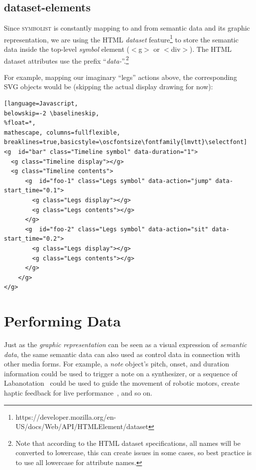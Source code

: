 \documentclass{article}
\def\symbolist{\textsc{symbolist}\xspace}
\def\oscfontsize{\tiny}
\begin{document}
\subsection{dataset-elements}\label{sec:dataset}

Since \symbolist is constantly mapping to and from semantic data and its graphic representation, we are using the HTML \textit{dataset} feature\footnote{https://developer.mozilla.org/en-US/docs/Web/API/HTMLElement/dataset} to store the semantic data inside the top-level \textit{symbol} element ($<$g$>$ or $<$div$>$).
The HTML dataset attributes use the prefix ``\textit{data-}''.\footnote{Note that according to the HTML dataset specifications, all names will be converted to lowercase, this can create issues in some cases, so best practice is to use all lowercase for attribute names.}

For example, mapping our imaginary ``legs'' actions above, the corresponding SVG objects would be (skipping the actual display drawing for now):

\begin{minipage}{\linewidth}
\begin{lstlisting}[language=Javascript,
belowskip=-2 \baselineskip,
%float=*,
mathescape, columns=fullflexible, breaklines=true,basicstyle=\oscfontsize\fontfamily{lmvtt}\selectfont]
<g  id="bar" class="Timeline symbol" data-duration="1">
  <g class="Timeline display"></g>
  <g class="Timeline contents">
      <g  id="foo-1" class="Legs symbol" data-action="jump" data-start_time="0.1">
        <g class="Legs display"></g>
        <g class="Legs contents"></g>
      </g>
      <g  id="foo-2" class="Legs symbol" data-action="sit" data-start_time="0.2">
        <g class="Legs display"></g>
        <g class="Legs contents"></g>
      </g>
    </g>
</g>
\end{lstlisting}
\end{minipage}




\section{Performing Data}

Just as the \textit{graphic representation} can be seen as a visual expression of \textit{semantic data}, the same semantic data can also used as control data in connection with other media forms. For example, a \textit{note} object's pitch, onset, and duration information could be used to trigger a note on a synthesizer, or a sequence of Labanotation~\cite{guest2014labanotation} could be used to guide the movement of robotic motors, create haptic feedback for live performance~\cite{west2019design}, and so on. 
\end{document}
